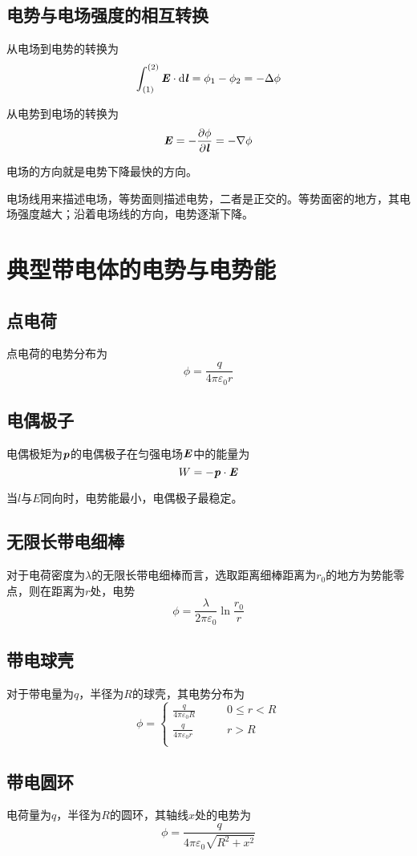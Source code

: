 \documentclass[UTF8,openany]{book}
\begin{document}
	\subsection{电势与电场强度的相互转换}
	从电场到电势的转换为
	$$\int_{(1)}^{(2)}\textbf{\textit{E}}\cdot\mathrm{d}\textbf{\textit{l}}=\phi_1-\phi_2=-\Delta\phi$$
	\par 从电势到电场的转换为
	$$\textbf{\textit{E}}=-\frac{\partial\phi}{\partial\textbf{\textit{l}}}=-\nabla\phi$$
	\par 电场的方向就是电势下降最快的方向。
	\par 电场线用来描述电场，等势面则描述电势，二者是正交的。等势面密的地方，其电场强度越大；沿着电场线的方向，电势逐渐下降。
	\section{典型带电体的电势与电势能}
	\subsection{点电荷}
	点电荷的电势分布为
	$$\phi=\frac{q}{4\pi\varepsilon_0r}$$
	\subsection{电偶极子}
	电偶极矩为$\textbf{\textit{p}}$的电偶极子在匀强电场$\textbf{\textit{E}}$中的能量为
	$$W=-\textbf{\textit{p}}\cdot\textbf{\textit{E}}$$
	\par 当$l$与$E$同向时，电势能最小，电偶极子最稳定。
	\subsection{无限长带电细棒}
	对于电荷密度为$\lambda$的无限长带电细棒而言，选取距离细棒距离为$r_0$的地方为势能零点，则在距离为$r$处，电势
	$$\phi=\frac{\lambda}{2\pi\varepsilon_0}\ln\frac{r_0}{r}$$
	\subsection{带电球壳}
	\par 对于带电量为$q$，半径为$R$的球壳，其电势分布为
	$$\phi=\begin{cases}
	\frac{q}{4\pi\varepsilon_0R} \quad & \quad 0\leqslant r<R \\
	\frac{q}{4\pi\varepsilon_0r} \quad & \quad r>R\\
	\end{cases}$$
	\subsection{带电圆环}
	\par 电荷量为$q$，半径为$R$的圆环，其轴线$x$处的电势为
	$$\phi=\frac{q}{4\pi\varepsilon_0\sqrt{R^2+x^2}}$$
\end{document}

